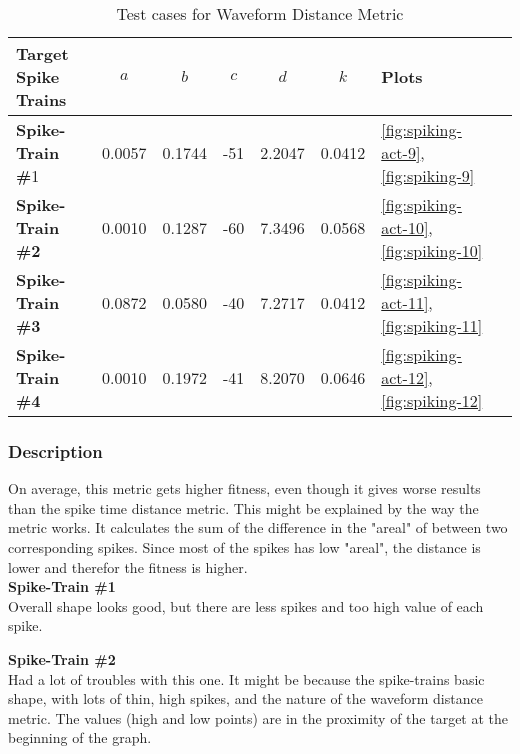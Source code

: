 \begin{table}[H]
	\begin{center}
		\begin{tabular}{ | l | c | c | c | c | c | l | l |}
	
	    \hline

			\textbf{Target Spike Trains} & \textbf{$a$} & \textbf{$b$} & \textbf{$c$} & \textbf{$d$} & \textbf{$k$} & \textbf{Plots}  \\ \hline 
			\textbf{Spike-Train \#}1 & 0.0057 & 0.1744 & -51 & 2.2047 & 0.0412 & \autoref{fig:spiking-act-9}, \autoref{fig:spiking-9} \\ \hline 
			\textbf{Spike-Train \#2} & 0.0010 & 0.1287 & -60 & 7.3496 & 0.0568 & \autoref{fig:spiking-act-10}, \autoref{fig:spiking-10} \\ \hline 
			\textbf{Spike-Train \#3} & 0.0872 & 0.0580 & -40 & 7.2717 & 0.0412 & \autoref{fig:spiking-act-11}, \autoref{fig:spiking-11} \\ \hline 
			\textbf{Spike-Train \#4} & 0.0010 & 0.1972 & -41 & 8.2070 & 0.0646 & \autoref{fig:spiking-act-12}, \autoref{fig:spiking-12}    \\ \hline 

	    \end{tabular}
	
	\end{center}
    \caption{Test cases for Waveform Distance Metric}
\end{table}

\subsubsection{Description}

On average, this metric gets higher fitness, even though it gives worse results than the spike time
distance metric. This might be explained by the way the metric works. It calculates the sum of the 
difference in the "areal" of between two corresponding spikes. Since most of the spikes has low
"areal", the distance is lower and therefor the fitness is higher.   \\


\textbf{Spike-Train \#1} \\
Overall shape looks good, but there are less spikes and too high value of each spike. 


\textbf{Spike-Train \#2} \\
Had a lot of troubles with this one. It might be because the spike-trains basic shape, with
lots of thin, high spikes, and the nature of the waveform distance metric. The values (high and low points)
are in the proximity of the target at the beginning of the graph. \\


